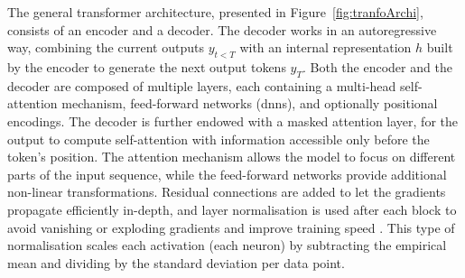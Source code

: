 The general transformer architecture, presented in Figure~\ref{fig:tranfoArchi}, consists of an encoder and a decoder. The decoder works in an autoregressive way, combining the current outputs $y_{t<T}$ with an internal representation $h$ built by the encoder to generate the next output tokens $y_{T}$. Both the encoder and the decoder are composed of multiple layers, each containing a multi-head self-attention mechanism, feed-forward networks (\glspl{dnn}), and optionally positional encodings. The decoder is further endowed with a masked attention layer, for the output to compute self-attention with information accessible only before the token's position. The attention mechanism allows the model to focus on different parts of the input sequence, while the feed-forward networks provide additional non-linear transformations. Residual connections are added to let the gradients propagate efficiently in-depth, and layer normalisation is used after each block to avoid vanishing or exploding gradients and improve training speed \cite{ba2016layer}. This type of normalisation scales each activation (each neuron) by subtracting the empirical mean and dividing by the standard deviation per data point. \\


